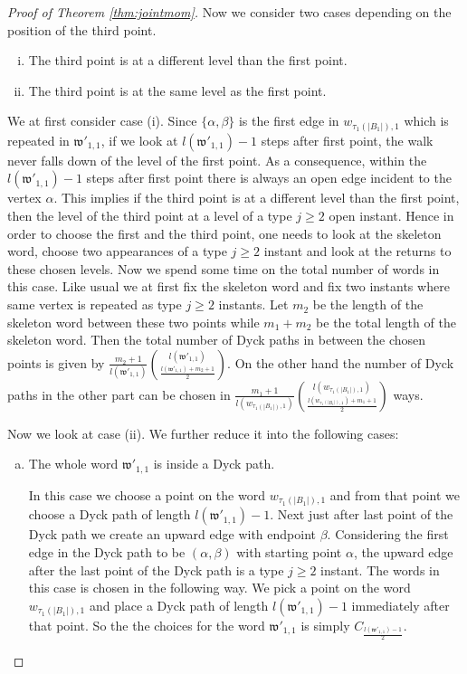 \documentclass[12pt]{article}
\numberwithin{equation}{section}
\numberwithin{equation}{section}
\theoremstyle{definition}
\renewcommand{\1}{\bf 1}
\begin{document}
\begin{proof}[Proof of Theorem \ref{thm:jointmom}]
\noindent
Now we consider two cases depending on the position of the third point. 
\begin{enumerate}[(i)]
\item The third point is at a different level than the first point.
\item The third point is at the same level as the first point. 
\end{enumerate}
We at first consider case (i).
Since $\{\alpha,\beta\}$ is the first edge in $w_{\tau_{1}(|B_{1}|),1}$ which is repeated in $\mathfrak{w}'_{1,1}$, if we look at $l(\mathfrak{w}'_{1,1})-1$ steps after first point, the walk never falls down of the level of the first point. As a consequence, within the $l(\mathfrak{w}'_{1,1})-1$ steps after first point there is always an open edge incident to the vertex $\alpha$. This implies if the third point is at a different level than the first point, then the level of the third point at a level of a type $j \ge 2$ open instant. Hence in order to choose the first and the third point, one needs to look at the skeleton word, choose two appearances of a type $j \ge 2$ instant and look at the returns to these chosen levels. Now we spend some time on the total number of words in this case. Like usual we at first fix the skeleton word and fix two instants where same vertex is repeated as type $j\ge 2$ instants. Let $m_{2}$ be the length of the skeleton word between these two points while $m_{1}+m_{2}$ be the total length of the skeleton word. Then the total number of Dyck paths in between the chosen points is given by $\frac{m_{2}+1}{l(\mathfrak{w}'_{1,1})}\binom{l(\mathfrak{w}'_{1,1})}{\frac{l(\mathfrak{w}'_{1,1})+m_{2}+1}{2}}$. On the other hand the number of Dyck paths in the other part can be chosen in $\frac{m_{1}+1}{l(w_{\tau_{1}(|B_{1}|),1})}\binom{l(w_{\tau_{1}(|B_{1}|),1})}{\frac{l(w_{\tau_{1}(|B_{1}|),1})+m_{1}+1}{2}}$ ways.  	

\noindent 
Now we look at case (ii). We further reduce it into the following cases: 
\begin{enumerate}[(a)]
\item The whole word $\mathfrak{w}'_{1,1}$ is inside a Dyck path. 

In this case we choose a point on the word $w_{\tau_{1}(|B_{1}|),1}$ and from that point we choose a Dyck path of length $l(\mathfrak{w}'_{1,1})-1$. Next just after last point of the Dyck path we create an upward edge with endpoint $\beta$. Considering the first edge in the Dyck path to be $(\alpha, \beta )$ with starting point $\alpha$, the upward edge after the last point of the Dyck path is a type $j\ge 2$ instant. The words in this case is chosen in the following way. We pick a point on the word $w_{\tau_{1}(|B_{1}|),1}$ and place a Dyck path of length $l(\mathfrak{w}'_{1,1})-1$ immediately after that point. So the the choices for the word $\mathfrak{w}'_{1,1}$ is simply $C_{\frac{l(\mathfrak{w}'_{1,1})-1}{2}}$.


\end{enumerate}
\end{proof}
\end{document}
